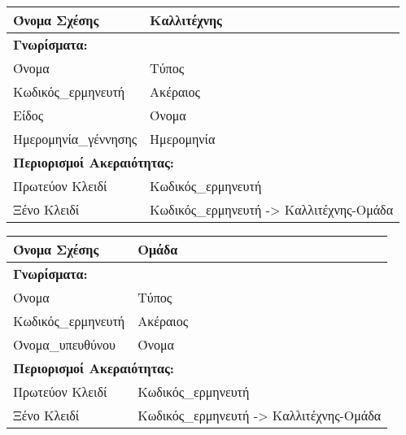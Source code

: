 \begin{tabular}{|p{6cm}|p{8cm}|}
  \hline
  Όνομα Σχέσης        & Καλλιτέχνης                            \\ \hline
  \multicolumn{2}{|l|}{\textbf{Γνωρίσματα:}}                   \\ \hline
  Όνομα               & Τύπος                                  \\ \hline
  Κωδικός\_ερμηνευτή   & Ακέραιος                               \\ \hline
  Είδος               & Όνομα                                  \\ \hline
  Ημερομηνία\_γέννησης & Ημερομηνία                             \\ \hline
  \multicolumn{2}{|l|}{\textbf{Περιορισμοί Ακεραιότητας:}}     \\ \hline
  Πρωτεύον Κλειδί     & Κωδικός\_ερμηνευτή                      \\ \hline
  Ξένο Κλειδί         & Κωδικός\_ερμηνευτή -> Καλλιτέχνης-Ομάδα \\ \hline
\end{tabular}

\begin{tabular}{|p{6cm}|p{8cm}|}
  \hline
  Όνομα Σχέσης      & Ομάδα                                  \\ \hline
  \multicolumn{2}{|l|}{\textbf{Γνωρίσματα:}}                 \\ \hline
  Όνομα             & Τύπος                                  \\ \hline
  Κωδικός\_ερμηνευτή & Ακέραιος                               \\ \hline
  Όνομα\_υπευθύνου   & Όνομα                                  \\ \hline
  \multicolumn{2}{|l|}{\textbf{Περιορισμοί Ακεραιότητας:}}   \\ \hline
  Πρωτεύον Κλειδί   & Κωδικός\_ερμηνευτή                      \\ \hline
  Ξένο Κλειδί       & Κωδικός\_ερμηνευτή -> Καλλιτέχνης-Ομάδα \\ \hline
\end{tabular}


